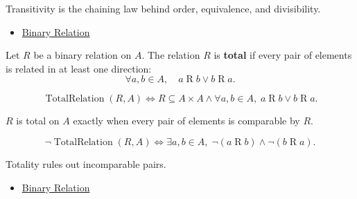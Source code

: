 \begin{remark*}[Interpretation]
Transitivity is the chaining law behind order, equivalence, and divisibility.
\end{remark*}

\begin{dependencies}
\begin{itemize}
  \item \hyperref[def:binary-relation]{Binary Relation}
\end{itemize}
\end{dependencies}

\begin{definition}
\label{def:rel-total}
Let $R$ be a binary relation on $A$.
The relation $R$ is \textbf{total} if every pair of elements is related in at
least one direction:
\[
\forall a,b \in A,\quad
a \mathrel{R} b \lor b \mathrel{R} a.
\]
\end{definition}

\begin{remark*}
\[
\operatorname{TotalRelation}(R,A)
\Longleftrightarrow
R\subseteq A\times A
\land
\forall a,b\in A,\; a\mathrel{R}b \lor b\mathrel{R}a.
\]
\end{remark*}

\begin{remark*}
$R$ is total on $A$ exactly when every pair of elements is comparable by $R$.
\end{remark*}

\begin{remark*}
\[
\neg\operatorname{TotalRelation}(R,A)
\Longleftrightarrow
\exists a,b\in A,\; \lnot(a\mathrel{R}b) \land \lnot(b\mathrel{R}a).
\]
\end{remark*}

\begin{remark*}[Interpretation]
Totality rules out incomparable pairs.
\end{remark*}

\begin{dependencies}
\begin{itemize}
  \item \hyperref[def:binary-relation]{Binary Relation}
\end{itemize}
\end{dependencies}
